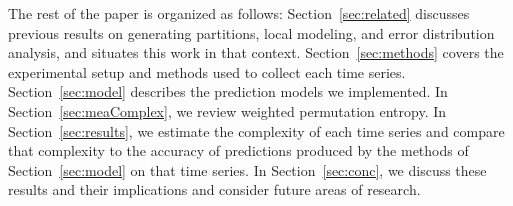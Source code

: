 

The rest of the paper is organized as follows:
Section~\ref{sec:related} discusses previous results on generating
partitions, local modeling, and error distribution analysis, and
situates this work in that context. Section~\ref{sec:methods} covers
the experimental setup and methods used to collect each time
series. Section~\ref{sec:model} describes the prediction models we
implemented.  In Section~\ref{sec:meaComplex}, we review weighted
permutation entropy.  In Section~\ref{sec:results}, we estimate the
complexity of each time series and compare that complexity to the
accuracy of predictions produced by the methods of
Section~\ref{sec:model} on that time series.  In
Section~\ref{sec:conc}, we discuss these results and their
implications and consider future areas of research.

